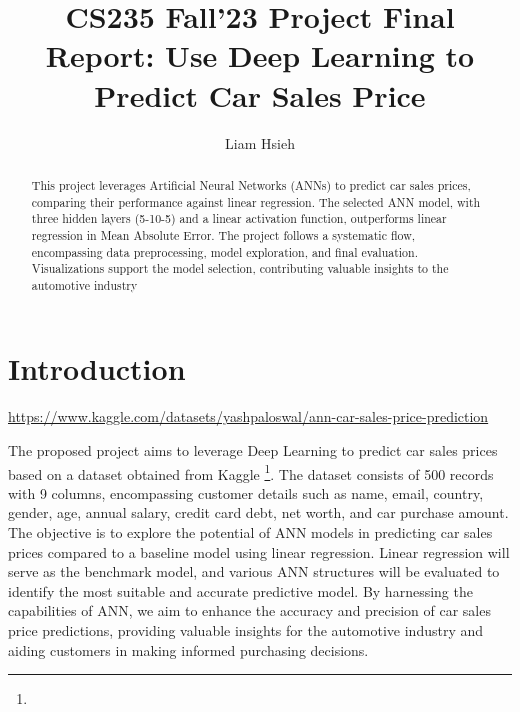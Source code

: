 \documentclass[sigplan,screen]{acmart}
\begin{document}
\title{CS235 Fall'23 Project Final Report: Use Deep Learning to Predict Car Sales Price}

\author{Liam Hsieh}

\renewcommand{\shortauthors}{Liam Y. Hsieh}

\begin{abstract}
This project leverages Artificial Neural Networks (ANNs) to predict car sales prices, comparing their performance against linear regression. The selected ANN model, with three hidden layers (5-10-5) and a linear activation function, outperforms linear regression in Mean Absolute Error. The project follows a systematic flow, encompassing data preprocessing, model exploration, and final evaluation. Visualizations support the model selection, contributing valuable insights to the automotive industry
\end{abstract}



\maketitle

\section{Introduction}

\urldef{\dataurl}\url{https://www.kaggle.com/datasets/yashpaloswal/ann-car-sales-price-prediction}

The proposed project aims to leverage Deep Learning to predict car sales prices based on a dataset obtained from Kaggle \footnote{\dataurl}. The dataset consists of 500 records with 9 columns, encompassing customer details such as name, email, country, gender, age, annual salary, credit card debt, net worth, and car purchase amount. The objective is to explore the potential of ANN models in predicting car sales prices compared to a baseline model using linear regression. Linear regression will serve as the benchmark model, and various ANN structures will be evaluated to identify the most suitable and accurate predictive model. By harnessing the capabilities of ANN, we aim to enhance the accuracy and precision of car sales price predictions, providing valuable insights for the automotive industry and aiding customers in making informed purchasing decisions.
\end{document}

